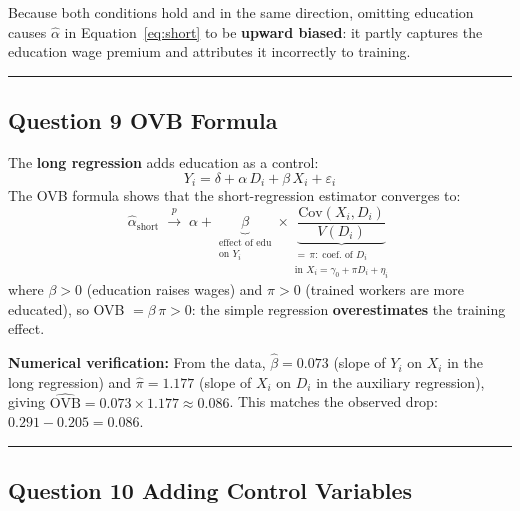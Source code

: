 \documentclass[paper=a4, fontsize=11pt]{scrartcl}
\newcommand{\horrule}[1]{\rule{\linewidth}{#1}}
\begin{document}
Because both conditions hold and in the same direction,
omitting education causes $\hat{\alpha}$ in Equation~\eqref{eq:short} to be
\textbf{upward biased}: it partly captures the education wage premium and attributes it
incorrectly to training.

\bigskip\horrule{0.4pt}\bigskip

\subsection*{Question 9 \quad OVB Formula}

The \textbf{long regression} adds education as a control:
\begin{equation}
  Y_i = \delta + \alpha \, D_i + \beta \, X_i + \varepsilon_i
  \label{eq:long}
\end{equation}
The OVB formula shows that the short-regression estimator converges to:
\begin{equation}
  \hat{\alpha}_{\text{short}} \;\overset{p}{\longrightarrow}\;
    \alpha + \underbrace{\beta}_{\substack{\text{effect of edu}\\\text{on }Y_i}}
            \times
            \underbrace{\dfrac{\text{Cov}(X_i, D_i)}{V(D_i)}}_{\substack{= \,\pi:\;\text{coef.\ of }D_i\\\text{in }X_i = \gamma_0 + \pi D_i + \eta_i}}
  \label{eq:ovb}
\end{equation}
where $\beta > 0$ (education raises wages) and $\pi > 0$ (trained workers are more educated),
so OVB $= \beta\,\pi > 0$: the simple regression \textbf{overestimates} the training effect.

\medskip
\textbf{Numerical verification:}
From the data,
$\hat{\beta} = 0.073$ (slope of $Y_i$ on $X_i$ in the long regression)
and $\hat{\pi} = 1.177$ (slope of $X_i$ on $D_i$ in the auxiliary regression),
giving $\widehat{\text{OVB}} = 0.073 \times 1.177 \approx \mathbf{0.086}$.
This matches the observed drop: $0.291 - 0.205 = 0.086$. \checkmark

\bigskip\horrule{0.4pt}\bigskip

\subsection*{Question 10 \quad Adding Control Variables}
\end{document}
